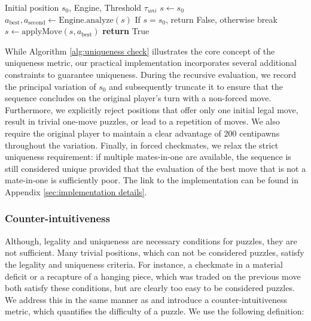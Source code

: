 \begin{algorithm}[h]
    \caption{Uniqueness metric}
    \label{alg:uniqueness check}
    \begin{algorithmic}
        \Require Initial position $s_0$, Engine, Threshold $\tau_{uni}$
        \State $s \leftarrow s_0$
            \State $a_{\text{best}}, a_{\text{second}} \leftarrow \text{Engine.analyze}(s)$
                    \State If $s = s_0$, return False, otherwise break
                \EndIf
            \EndIf
            \State $s \leftarrow \text{applyMove}(s, a_{\text{best}})$
        \EndWhile
        \State \textbf{return} True
    \end{algorithmic}
\end{algorithm}

While Algorithm \ref{alg:uniqueness check} illustrates the core concept of the uniqueness metric, our practical implementation incorporates several additional constraints to guarantee uniqueness. During the recursive evaluation, we record the principal variation of $s_0$ and subsequently truncate it to ensure that the sequence concludes on the original player's turn with a non-forced move. Furthermore, we explicitly reject positions that offer only one initial legal move, result in trivial one-move puzzles, or lead to a repetition of moves. We also require the original player to maintain a clear advantage of $200$ centipawns throughout the variation. Finally, in forced checkmates, we relax the strict uniqueness requirement: if multiple mates-in-one are available, the sequence is still considered unique provided that the evaluation of the best move that is not a mate-in-one is sufficiently poor. The link to the implementation can be found in Appendix \ref{sec:implementation details}.

\subsubsection{Counter-intuitiveness}
\label{sec:counter-intuitiveness}

Although, legality and uniqueness are necessary conditions for puzzles, they are not sufficient. Many trivial positions, which can not be considered puzzles, satisfy the legality and uniqueness criteria. For instance, a checkmate in a material deficit or a recapture of a hanging piece, which was traded on the previous move both satisfy these conditions, but are clearly too easy to be considered puzzles. We address this in the same manner as \citeauthor{feng2025generatingcreativechesspuzzles} and introduce a counter-intuitiveness metric, which quantifies the difficulty of a puzzle. We use the following definition:

